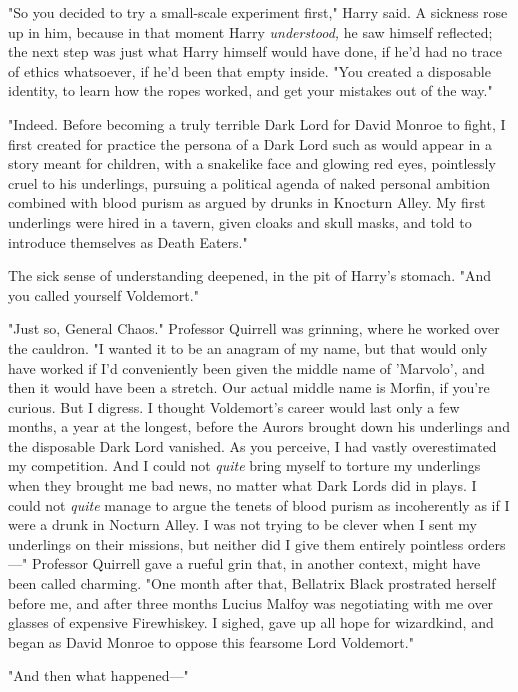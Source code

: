 "So you decided to try a small-scale experiment first," Harry said. A sickness 
rose up in him, because in that moment Harry \emph{understood,} he saw himself 
reflected; the next step was just what Harry himself would have done, if he'd 
had no trace of ethics whatsoever, if he'd been that empty inside. "You created 
a disposable identity, to learn how the ropes worked, and get your mistakes out 
of the way."

"Indeed. Before becoming a truly terrible Dark Lord for David Monroe to fight, 
I first created for practice the persona of a Dark Lord such as would appear in 
a story meant for children, with a snakelike face and glowing red eyes, 
pointlessly cruel to his underlings, pursuing a political agenda of naked 
personal ambition combined with blood purism as argued by drunks in Knocturn 
Alley. My first underlings were hired in a tavern, given cloaks and skull 
masks, and told to introduce themselves as Death Eaters."

The sick sense of understanding deepened, in the pit of Harry's stomach. "And 
you called yourself Voldemort."

"Just so, General Chaos." Professor Quirrell was grinning, where he worked over 
the cauldron. "I wanted it to be an anagram of my name, but that would only 
have worked if I'd conveniently been given the middle name of 'Marvolo', and 
then it would have been a stretch. Our actual middle name is Morfin, if you're 
curious. But I digress. I thought Voldemort's career would last only a few 
months, a year at the longest, before the Aurors brought down his underlings 
and the disposable Dark Lord vanished. As you perceive, I had vastly 
overestimated my competition. And I could not \emph{quite} bring myself to 
torture my underlings when they brought me bad news, no matter what Dark Lords 
did in plays. I could not \emph{quite} manage to argue the tenets of blood 
purism as incoherently as if I were a drunk in Nocturn Alley. I was not trying 
to be clever when I sent my underlings on their missions, but neither did I 
give them entirely pointless orders---" Professor Quirrell gave a rueful grin 
that, in another context, might have been called charming. "One month after 
that, Bellatrix Black prostrated herself before me, and after three months 
Lucius Malfoy was negotiating with me over glasses of expensive Firewhiskey. I 
sighed, gave up all hope for wizardkind, and began as David Monroe to oppose 
this fearsome Lord Voldemort."

"And then what happened---"

